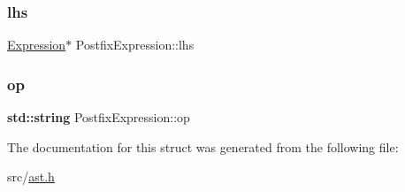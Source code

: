 \subsubsection{\texorpdfstring{lhs}{lhs}}
{\footnotesize\ttfamily \hyperlink{struct_expression}{Expression}$\ast$ Postfix\+Expression\+::lhs}

\mbox{\label{struct_postfix_expression_a9ce1fb591d6787626d2eda8a9ca0a3cd}} 
\subsubsection{\texorpdfstring{op}{op}}
{\footnotesize\ttfamily \textbf{ std\+::string} Postfix\+Expression\+::op}



The documentation for this struct was generated from the following file\+:\begin{DoxyCompactItemize}
\item 
src/\hyperlink{ast_8h}{ast.\+h}\end{DoxyCompactItemize}
